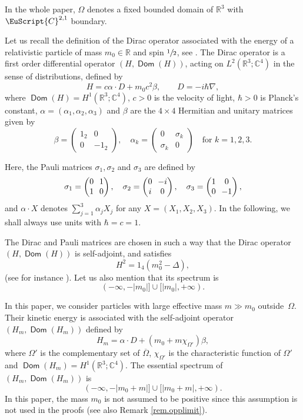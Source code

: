 \documentclass[JEP,XML,SOM,Unicode]{cedram}
\let\mathcal \EuScript
\newcommand{\cC}{\mathcal{C}}
\theoremstyle{plain}
\theoremstyle{definition}
\newcommand{\RR}{\mathbb{R}}
\newcommand{\CC}{\mathbb{C}}
\DeclareMathOperator{\Dom}{\mathsf{Dom}}
\begin{document}
In the whole paper, $\Omega$ deno\-tes a fixed bounded domain of $\RR^3$ with $\cC^{2,1}$ boundary.

Let us recall the definition of the Dirac operator associated with the energy of a relativistic particle of mass $m_0\in \RR$ and spin $\sfrac{1}{2}$, see \cite{Thaller1992}. The Dirac operator is a first order differential operator $(H,\Dom(H))$, acting on $L^2(\RR^3;\mathbb{C}^4)$ in the sense of distributions, defined by
\begin{equation}
H=c\alpha\cdot D+m_0c^2\beta,\qquad D=-i\hbar\nabla,
\end{equation}
where $\Dom(H) = H^1(\RR^3; \CC^4)$, $c>0$ is the velocity of light, $\hbar>0$ is Planck's constant, $\alpha=(\alpha_1,\alpha_2,\alpha_3)$ and $\beta$
are the $4\times4$ Hermitian and unitary matrices given by
\[
\beta=\begin{pmatrix}1_2&0\\0&-1_2\end{pmatrix},\quad
\alpha_k=\begin{pmatrix}0&\sigma_k\\\sigma_k&0\end{pmatrix}\quad\mbox{for }k=1,2,3.
\]

Here, the Pauli matrices $\sigma_1,\sigma_2$ and $\sigma_3$ are defined by
\[\arraycolsep3.5pt
\sigma_1 = \begin{pmatrix}
0&1\\1&0
\end{pmatrix},
\quad
\sigma_2 = \begin{pmatrix}0&-i\\i&0
\end{pmatrix},
\quad
\sigma_3 = \begin{pmatrix}
1&0\\0&-1
\end{pmatrix},
\]
and $\alpha \cdot X$ denotes $\sum_{j=1}^3\alpha_j X_j$ for any $X = (X_1,X_2,X_3)$.
In the following, we shall always use units with $\hbar=c=1$.

The Dirac and Pauli matrices are chosen in such a way that the Dirac operator $(H,\Dom(H))$ is self-adjoint, and satisfies
\[
H^2 = 1_4(m_0^2-\Delta),
\]
(see for instance \cite[\S 1.1]{Thaller1992}).
Let us also mention that its spectrum is
\[(-\infty,-|m_0|]\cup[|m_0|,+\infty).\]

In this paper, we consider particles with large effective mass $m\gg m_0$ outside~$\Omega$. Their kinetic energy is associated with the self-adjoint operator $(H_m, \Dom(H_m))$ \hbox{defined} by
\[
H_{m}=\alpha\cdot D+(m_0 + m\chi_{\Omega'})\beta,
\]
where $\Omega'$ is the complementary set of $\overline{\Omega}$, $\chi_{\Omega'}$ is the characteristic function of $\Omega'$ and $\Dom(H_m) = H^1(\RR^3;\CC^4)$.
The essential spectrum of $(H_m, \Dom(H_m))$ is
\[
(-\infty,-|m_0 + m|]\cup[|m_0 + m|,+\infty).
\]
In this paper, the mass $m_0$ is not assumed to be positive since this assumption is not used in the proofs (see also Remark \ref{rem.opplimit}).
\end{document}
